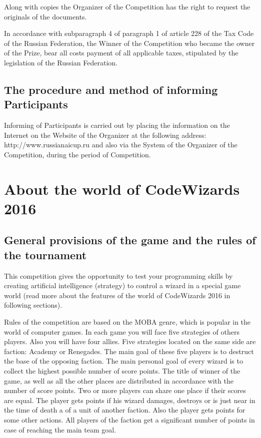 Along with copies the Organizer of the Competition has the right to request the originals of the documents.

In accordance with subparagraph 4 of paragraph 1 of article 228 of the Tax Code of the Russian Federation, the Winner of the Competition who became the owner of the Prize, bear all costs
payment of all applicable taxes, stipulated by the legislation of the Russian Federation.

\section{The procedure and method of informing Participants}

Informing of Participants is carried out by placing the information on the Internet on the Website of the Organizer at the following address:
http://www.russianaicup.ru and also via the System of the Organizer of the Competition, during the period of Competition.

\chapter{About the world of CodeWizards 2016}

\section{General provisions of the game and the rules of the tournament}

This competition gives the opportunity to test your programming skills by creating artificial intelligence (strategy) to
control a wizard in a special game world (read more about the features of the world of CodeWizards 2016 in following sections).

Rules of the competition are based on the MOBA genre, which is popular in the world of computer games. In each game you will face five strategies of
others players. Also you will have four allies. Five strategies located on the same side are faction: Academy
or Renegades. The main goal of these five players is to destruct the base of the opposing faction.
The main personal goal of every wizard is to collect the highest possible number of score points.
The title of winner of the game, as well as all the other places are
distributed in accordance with the number of score points. Two or more players can share one place if their scores are equal. The player gets
points if his wizard damages, destroys or is just near in the time of death a of a unit of another faction. Also the player gets
points for some other actions. All players of the faction get a significant number of points in case of reaching the main team goal.

